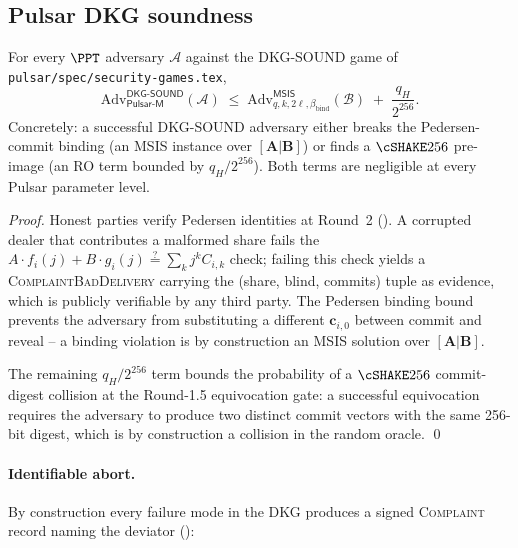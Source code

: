 
\subsection*{Pulsar DKG soundness}

\begin{theorem}
\label{thm:pulsar-dkg-sound}
For every $\PPT$ adversary $\mathcal{A}$ against the DKG-SOUND game
of \texttt{pulsar/spec/security-games.tex},
\[
  \mathrm{Adv}^{\mathsf{DKG\text{-}SOUND}}_{\mathsf{Pulsar\text{-}M}}(\mathcal{A})
  \;\le\;
  \mathrm{Adv}^{\mathsf{MSIS}}_{q, k, 2\ell, \beta_{\mathrm{bind}}}(\mathcal{B})
  \;+\;
  \frac{q_H}{2^{256}}.
\]
Concretely: a successful DKG-SOUND adversary either breaks the
Pedersen-commit binding (an MSIS instance over $[\mathbf{A} | \mathbf{B}]$)
or finds a $\cSHAKE256$ pre-image (an RO term bounded by $q_H /
2^{256}$). Both terms are negligible at every Pulsar parameter
level.
\end{theorem}

\begin{proof}
Honest parties verify Pedersen identities at Round~2
(). A corrupted dealer that contributes a malformed
share fails the $A \cdot f_i(j) + B \cdot g_i(j) \stackrel{?}{=}
\sum_k j^k C_{i,k}$ check; failing this check yields a
\textsc{ComplaintBadDelivery} carrying the (share, blind, commits)
tuple as evidence, which is publicly verifiable by any third party.
The Pedersen binding bound prevents the adversary from substituting
a different $\mathbf{c}_{i,0}$ between commit and reveal -- a binding
violation is by construction an MSIS solution over $[\mathbf{A} |
\mathbf{B}]$.

The remaining $q_H / 2^{256}$ term bounds the probability of a
$\cSHAKE256$ commit-digest collision at the Round-1.5 equivocation
gate: a successful equivocation requires the adversary to produce
two distinct commit vectors with the same 256-bit digest, which
is by construction a collision in the random oracle. \qed
\end{proof}

\paragraph{Identifiable abort.}
By construction every failure mode in the DKG produces a signed
\textsc{Complaint} record naming the deviator
():

